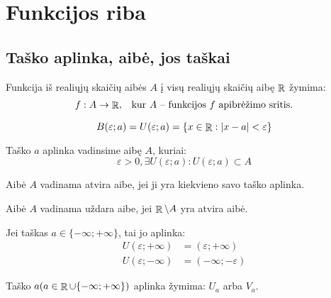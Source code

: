 \chapter{Funkcijos riba}

\section{Taško aplinka, aibė, jos taškai}

\begin{notation}
  Funkcija iš realiųjų skaičių aibės $A$ į visų realiųjų skaičių aibę 
  $\mathop{\mathbb{R}}$ žymima:
  \[
  \begin{array}[]{c l}
    f : A \to \RSET, & \text{kur $A$ – funkcijos $f$ apibrėžimo sritis.}
  \end{array}
  \]
\end{notation}

\begin{defn}
  \[
  B(\varepsilon; a) = U(\varepsilon; a) =%
  \{ x \in \RSET : |x - a| < \varepsilon \}
  \]
\end{defn}

\begin{defn}
  Taško $a$ aplinka vadinsime aibę $A$, kuriai:
  \[
  \varepsilon > 0, \exists U(\varepsilon; a) : U(\varepsilon; a) \subset A
  \]
\end{defn}

\begin{defn}
  Aibė $A$ vadinama atvira aibe, jei ji yra kiekvieno savo taško aplinka.
\end{defn}

\begin{defn}
  Aibė $A$ vadinama uždara aibe, jei $\mathop{\mathbb{R}} \setminus A$ yra atvira aibė.
\end{defn}

\begin{note}
  Jei taškas $a \in \{-\infty; +\infty\}$, tai jo aplinka:
  \begin{align*}
    U(\varepsilon; +\infty) &= (\varepsilon; +\infty) \\
    U(\varepsilon; -\infty) &= (-\infty; -\varepsilon)
  \end{align*}
\end{note}

\begin{notation}
  Taško $a (a \in \mathop{\mathbb{R}} \cup \{-\infty;+\infty\})$ aplinka žymima:
  $U_{a}$ arba $V_{a}$. %
\end{notation}

